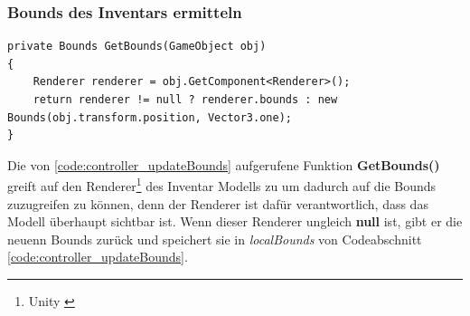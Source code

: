 \subsubsection{Bounds des Inventars ermitteln}
\begin{lstlisting}[style=csharp, caption={Funktion um Bounds zu ermitteln}, label=code:controller_getBounds]
private Bounds GetBounds(GameObject obj)
{
    Renderer renderer = obj.GetComponent<Renderer>();
    return renderer != null ? renderer.bounds : new Bounds(obj.transform.position, Vector3.one);
}
\end{lstlisting}
Die von \ref{code:controller_updateBounds} aufgerufene Funktion \textbf{GetBounds()} greift auf den Renderer\footnote{Unity \cite{Renderer}}
des Inventar Modells zu um dadurch auf die Bounds zuzugreifen zu können, denn der Renderer ist dafür verantwortlich,
dass das Modell überhaupt sichtbar ist. Wenn dieser Renderer ungleich \textbf{null} ist, gibt er die neuenn Bounds zurück und speichert
sie in \textit{localBounds} von Codeabschnitt \ref{code:controller_updateBounds}.\\

